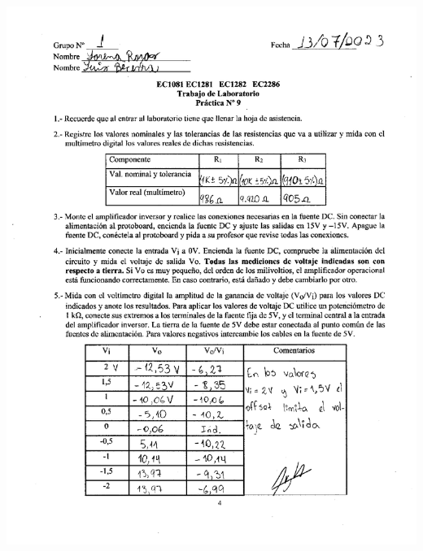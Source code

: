 \documentclass[12pt]{article}
\begin{document}
	\includegraphics[width=16cm,height=21cm]{Img/lab_9_page-0001}\\
\end{document}
